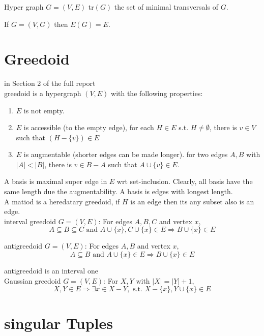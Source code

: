\documentclass[12pt]{article}
\begin{document}
Hyper graph $G=(V,E)$ tr$(G)$ the set of minimal transversals of $G$.

If $G=(V, G)$ then $E(G)=E$.

\section{Greedoid}

in Section 2 of the full report\\

greedoid is a hypergraph $(V,E)$ with the following properties:

\begin{enumerate}
\item $E$ is not empty.

\item $E$ is accessible (to the empty edge), for each $H\in E$ s.t. $H\not=\emptyset$, there is $v\in V$ such that $(H-\{v\})\in E$

\item $E$ is augmentable (shorter edges can be made longer). for two edges $A,B$ with $|A|<|B|$, there is $v\in B-A$ such that $A\cup\{v\}\in E$.
\end{enumerate}


A basis is maximal super edge  in $E$ wrt set-inclusion. Clearly, all basis have the same length due the augmentability. A basis is edges with longest length.\\


A matiod is a heredatary greedoid, if $H$ is an edge then its any subset also is an edge. \\


interval greedoid $G=(V,E)$: For edges $A,B,C$ and vertex $x$, $$A\subseteq B\subseteq C\mbox{ and }A\cup\{x\}, C\cup\{x\}\in E \Longrightarrow B\cup \{x\}\in E$$


antigreedoid $G=(V,E)$: For edges $A,B$ and vertex $x$, $$A\subseteq B\mbox{ and }A\cup\{x\}\in E \Longrightarrow B\cup \{x\}\in E$$

antigreedoid is an interval one\\

Gaussian greedoid $G=(V,E)$: For $X, Y$ with $|X|=|Y|+1$,
$$X, Y\in E \Longrightarrow \exists x\in X-Y, \mbox{ s.t. }X-\{x\}, Y\cup\{x\}\in E$$


\section{singular Tuples}
\end{document}
